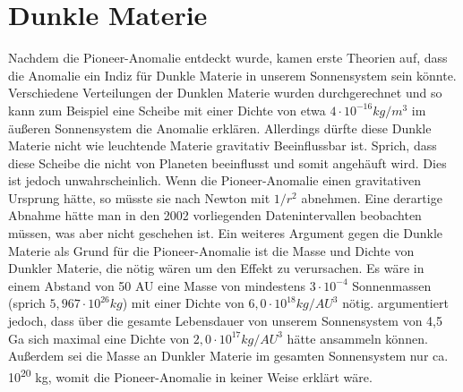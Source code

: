 
\section{ Dunkle Materie}

Nachdem die Pioneer-Anomalie entdeckt wurde, kamen erste Theorien auf,
dass die Anomalie ein Indiz f\"ur Dunkle Materie in unserem
Sonnensystem sein k\"onnte. Verschiedene Verteilungen der Dunklen
Materie wurden durchgerechnet und so kann zum Beispiel eine Scheibe mit
einer Dichte von etwa $4\cdot 10^{-16}\mathit{kg}/m^{3}$ im
\"au{\ss}eren Sonnensystem die Anomalie erkl\"aren. Allerdings d\"urfte
diese Dunkle Materie nicht wie leuchtende Materie gravitativ
Beeinflussbar ist\cite{Turyshev2010}. Sprich, dass diese Scheibe die nicht
von Planeten beeinflusst und somit angeh\"auft wird. Dies ist jedoch
unwahrscheinlich. Wenn die Pioneer-Anomalie einen gravitativen Ursprung
h\"atte, so m\"usste sie nach Newton mit  $1/r^{2}$ abnehmen. Eine
derartige Abnahme h\"atte man in den 2002 vorliegenden Datenintervallen
beobachten m\"ussen, was aber nicht geschehen ist. Ein weiteres
Argument gegen die Dunkle Materie als Grund f\"ur die Pioneer-Anomalie
ist die Masse und Dichte von Dunkler Materie, die n\"otig w\"aren um
den Effekt zu verursachen. Es w\"are in einem Abstand von 50 AU eine
Masse von mindestens  $3\cdot 10^{-4}$ Sonnenmassen (sprich 
$5,967\cdot 10^{26}\mathit{kg}$) mit einer Dichte von  $6,0\cdot
10^{18}\mathit{kg}/\mathit{AU}^{3}$ n\"otig. \cite{Xu2008} argumentiert jedoch, dass \"uber die gesamte Lebensdauer
von unserem Sonnensystem von 4,5 Ga sich maximal eine Dichte von 
$2,0\cdot 10^{17}\mathit{kg}/\mathit{AU}^{3}$ h\"atte ansammeln
k\"onnen. Au{\ss}erdem sei die Masse an Dunkler Materie im gesamten
Sonnensystem nur ca. {}10\textsuperscript{20 }kg, womit die
Pioneer-Anomalie in keiner Weise erkl\"art w\"are.
